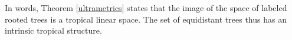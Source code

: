 \documentclass[12pt]{extarticle}
\newtheorem{theorem}{Theorem}
\numberwithin{theorem}{section}
\newtheorem{lemma}[theorem]{Lemma}
\newtheorem{definition}[theorem]{Definition}
\newtheorem{remark}[theorem]{Remark}
\newcommand{\RR}{\mathbb{R}}
\begin{document}
In words, Theorem \ref{ultrametrics} states that the image of the space of labeled rooted trees is a tropical linear space. The set of equidistant trees thus has an intrinsic tropical structure.

\begin{comment}

Tree metrics can be characterized in the following way:

\begin{lemma}[Four-point condition]
\label{four-point-condition}
A metric $d$ on the set $[n]$ is a tree metric iff, for any four elements $u,v,x,y\in [n]$, the maximum of $d(u,v)+d(x,y), d(u,x)+d(v,y)$, and $d(u,y)+d(x,v)$ is attained at least twice.
\end{lemma}
\begin{proof}
See \cite[Theorem 2.36]{PS}.
\end{proof}

\begin{remark}
Let $T\in\mathbb R^e$ be a tree metric. Lemma \ref{four-point-condition} implies that $T + \lambda \cdot {\bf 1}$ is also a tree metric for any nonnegative choice of $\lambda$. 
\end{remark}

\begin{definition}
Let $Q = (q_{ij})$ be an $n\times n$ symmetric matrix with zeros on the diagonal whose off-diagonal entries are variables. For each collection of four elements $u,v,x,y\in[n]$, define the quadratic tropical polynomial
\[g_{uvxy}(Q) = q_{uv}\otimes q_{xy} \oplus q_{ux}\otimes q_{vy} \oplus q_{uy}\otimes q_{vx}.\]
Thus $g_{uvxy}$ defines a tropical hypersurface $\mathcal T(g_{uvxy})$ in $\mathbb R^{\binom n 2}/{\bf 1}\RR$. 
\end{definition}

\begin{remark}
In fact, the intersection of the $\binom n 4$ tropical hypersurfaces $\mathcal T(g_{uvxy})$ is a tropical linear space, known as the \emph{tropical Grassmannian} $\mathcal T(Gr(2,n))$. Note that $g_{uvxy}(Q)$ is the tropicalization of the Plucker relation $p_{uv}p_{xy}-p_{ux}p_{vy}-p_{uy}p_{vx}$.
\end{remark}

\begin{theorem}
Let $\mathcal T$ be the collection of all tree metrics, identified with its image in $\mathbb R^{\binom n 2}/{\bf 1}\RR$. Then $\mathcal T$ equals the tropical Grassmannian $\mathcal T(Gr(2,n))$.
\end{theorem}
\begin{proof}
We show one containment. (For a full proof, see \cite{MS}[Theorem 4.3.5].) Fix $T\in \mathcal T$. We may assume that all coordinates of $T$ are nonnegative, so that $T$ is in fact a tree metric. Now Lemma \ref{four-point-condition} states that $T$ is a tree metric if and only if, for all $1\leq u<v<x<y\leq n$, the maximum of $d(u,v)+d(x,y), d(u,x)+d(v,y)$, and $d(u,y)+d(x,v)$ is attained at least twice. This is precisely what it means to be contained in intersection of the tropical hypersurfaces $\mathcal T(g_{uvxy})=\mathcal T(Gr(2,n))$.
\end{proof}


\end{comment}
\end{document}
